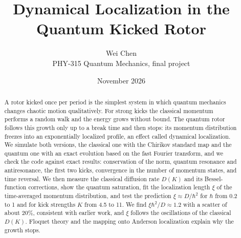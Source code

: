 \documentclass[11pt,letterpaper]{article}
\title{Dynamical Localization in the Quantum Kicked Rotor}
\author{Wei Chen\\[0.3em]\small PHY-315 Quantum Mechanics, final project}
\date{November 2026}
\begin{document}
\maketitle

\begin{abstract}
\noindent
A rotor kicked once per period is the simplest system in which quantum mechanics changes chaotic motion
qualitatively. For strong kicks the classical momentum performs a random walk and the energy grows without
bound. The quantum rotor follows this growth only up to a break time and then stops: its momentum
distribution freezes into an exponentially localized profile, an effect called dynamical localization. We
simulate both versions, the classical one with the Chirikov standard map and the quantum one with an exact
evolution based on the fast Fourier transform, and we check the code against exact results: conservation of
the norm, quantum resonance and antiresonance, the first two kicks, convergence in the number of momentum
states, and time reversal. We then measure the classical diffusion rate $D(K)$ and its Bessel-function
corrections, show the quantum saturation, fit the localization length $\xi$ of the time-averaged momentum
distribution, and test the prediction $\xi \approx D/\hbar^2$ for $\hbar$ from 0.2 to 1 and for kick strengths
$K$ from 4.5 to 11. We find $\xi\hbar^2/D \approx 1.2$ with a scatter of about 20\%, consistent with earlier
work, and $\xi$ follows the oscillations of the classical $D(K)$. Floquet theory and the mapping onto
Anderson localization explain why the growth stops.
\end{abstract}

\tableofcontents









\appendix








\end{document}
